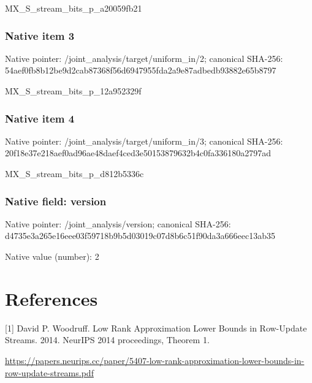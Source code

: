 \documentclass[10pt,a4paper]{article}
\begin{document}
\begingroup\raggedright\sloppy MX\_\allowbreak{}S\_\allowbreak{}stream\_\allowbreak{}bits\_\allowbreak{}p\_\allowbreak{}a20059fb21\par\endgroup

\subsubsection{Native item 3}
Native pointer: /joint\_\allowbreak{}analysis/target/uniform\_\allowbreak{}in/2; canonical SHA-256: 54aef0fb8b12be9d2cab87368f56d6947955fda2a9e87adbedb93882e65b8797

\begingroup\raggedright\sloppy MX\_\allowbreak{}S\_\allowbreak{}stream\_\allowbreak{}bits\_\allowbreak{}p\_\allowbreak{}12a952329f\par\endgroup

\subsubsection{Native item 4}
Native pointer: /joint\_\allowbreak{}analysis/target/uniform\_\allowbreak{}in/3; canonical SHA-256: 20f18e37e218aef0ad96ae48daef4ced3e50153879632b4c0fa336180a2797ad

\begingroup\raggedright\sloppy MX\_\allowbreak{}S\_\allowbreak{}stream\_\allowbreak{}bits\_\allowbreak{}p\_\allowbreak{}d812b5336c\par\endgroup

\subsubsection{Native field: version}
Native pointer: /joint\_\allowbreak{}analysis/version; canonical SHA-256: d4735e3a265e16eee03f59718b9b5d03019c07d8b6c51f90da3a666eec13ab35

Native value (number): 2

\section{References}
[1] David P. Woodruff. Low Rank Approximation Lower Bounds in Row-Update Streams. 2014. NeurIPS 2014 proceedings, Theorem 1.

\url{https://papers.neurips.cc/paper/5407-low-rank-approximation-lower-bounds-in-row-update-streams.pdf}
\end{document}
